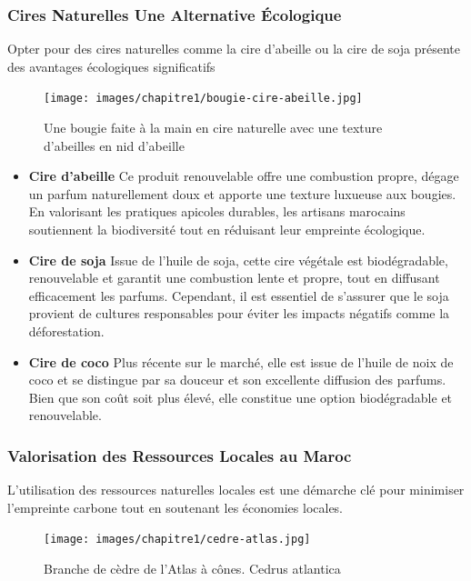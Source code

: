 \documentclass[11pt,fleqn,onecolumn,oneside]{book}
\begin{document}
\subsubsection*{Cires Naturelles Une Alternative Écologique}

Opter pour des cires naturelles comme la cire d’abeille ou la cire de soja présente des avantages écologiques significatifs 
\begin{figure}[htbp]
    \centering
    \texttt{[image: images/chapitre1/bougie-cire-abeille.jpg]}
    \caption{Une bougie faite à la main en cire naturelle avec une texture d'abeilles en nid d'abeille}
    \label{fig:image_bougie_cire_abeille}
\end{figure}



\begin{itemize}
    \item \textbf{Cire d’abeille} Ce produit renouvelable offre une combustion propre, dégage un parfum naturellement doux et apporte une texture luxueuse aux bougies. En valorisant les pratiques apicoles durables, les artisans marocains soutiennent la biodiversité tout en réduisant leur empreinte écologique.
    \item \textbf{Cire de soja} Issue de l’huile de soja, cette cire végétale est biodégradable, renouvelable et garantit une combustion lente et propre, tout en diffusant efficacement les parfums. Cependant, il est essentiel de s’assurer que le soja provient de cultures responsables pour éviter les impacts négatifs comme la déforestation.
    \item \textbf{Cire de coco} Plus récente sur le marché, elle est issue de l’huile de noix de coco et se distingue par sa douceur et son excellente diffusion des parfums. Bien que son coût soit plus élevé, elle constitue une option biodégradable et renouvelable.
\end{itemize}

\subsubsection*{Valorisation des Ressources Locales au Maroc}

L’utilisation des ressources naturelles locales est une démarche clé pour minimiser l’empreinte carbone tout en soutenant les économies locales.
\begin{figure}[htbp]
    \centering
    \texttt{[image: images/chapitre1/cedre-atlas.jpg]}
    \caption{Branche de cèdre de l'Atlas à cônes. Cedrus atlantica}
    \label{fig:cedrus_atlantica}
\end{figure}
\end{document}
